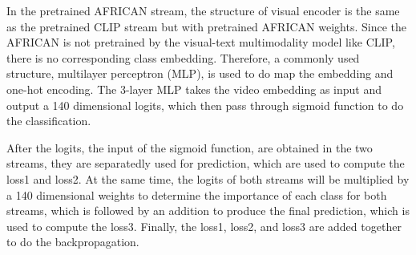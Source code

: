 In the pretrained AFRICAN stream, the structure of visual encoder is the same as the pretrained CLIP stream but with pretrained AFRICAN weights. Since the AFRICAN is not pretrained by the visual-text multimodality model like CLIP, there is no corresponding class embedding. Therefore, a commonly used structure, multilayer perceptron (MLP), is used to do map the embedding and one-hot encoding. The 3-layer MLP takes the video embedding as input and output a 140 dimensional logits, which then pass through sigmoid function to do the classification.

After the logits, the input of the sigmoid function, are obtained in the two streams, they are separatedly used for prediction, which are used to compute the loss1 and loss2. At the same time, the logits of both streams will be multiplied by a 140 dimensional weights to determine the importance of each class for both streams, which is followed by an addition to produce the final prediction, which is used to compute the loss3. Finally, the loss1, loss2, and loss3 are added together to do the backpropagation. 





